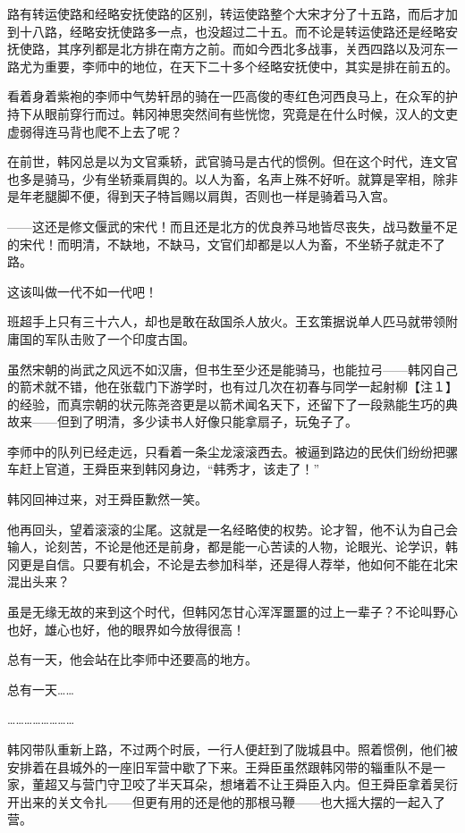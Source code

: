 路有转运使路和经略安抚使路的区别，转运使路整个大宋才分了十五路，而后才加到十八路，经略安抚使路多一点，也没超过二十五。而不论是转运使路还是经略安抚使路，其序列都是北方排在南方之前。而如今西北多战事，关西四路以及河东一路尤为重要，李师中的地位，在天下二十多个经略安抚使中，其实是排在前五的。

看着身着紫袍的李师中气势轩昂的骑在一匹高俊的枣红色河西良马上，在众军的护持下从眼前穿行而过。韩冈神思突然间有些恍惚，究竟是在什么时候，汉人的文吏虚弱得连马背也爬不上去了呢？

在前世，韩冈总是以为文官乘轿，武官骑马是古代的惯例。但在这个时代，连文官也多是骑马，少有坐轿乘肩舆的。以人为畜，名声上殊不好听。就算是宰相，除非是年老腿脚不便，得到天子特旨赐以肩舆，否则也一样是骑着马入宫。

——这还是修文偃武的宋代！而且还是北方的优良养马地皆尽丧失，战马数量不足的宋代！而明清，不缺地，不缺马，文官们却都是以人为畜，不坐轿子就走不了路。

这该叫做一代不如一代吧！

班超手上只有三十六人，却也是敢在敌国杀人放火。王玄策据说单人匹马就带领附庸国的军队击败了一个印度古国。

虽然宋朝的尚武之风远不如汉唐，但书生至少还是能骑马，也能拉弓——韩冈自己的箭术就不错，他在张载门下游学时，也有过几次在初春与同学一起射柳【注１】的经验，而真宗朝的状元陈尧咨更是以箭术闻名天下，还留下了一段熟能生巧的典故来——但到了明清，多少读书人好像只能拿扇子，玩兔子了。

李师中的队列已经走远，只看着一条尘龙滚滚西去。被逼到路边的民伕们纷纷把骡车赶上官道，王舜臣来到韩冈身边，“韩秀才，该走了！”

韩冈回神过来，对王舜臣歉然一笑。

他再回头，望着滚滚的尘尾。这就是一名经略使的权势。论才智，他不认为自己会输人，论刻苦，不论是他还是前身，都是能一心苦读的人物，论眼光、论学识，韩冈更是自信。只要有机会，不论是去参加科举，还是得人荐举，他如何不能在北宋混出头来？

虽是无缘无故的来到这个时代，但韩冈怎甘心浑浑噩噩的过上一辈子？不论叫野心也好，雄心也好，他的眼界如今放得很高！

总有一天，他会站在比李师中还要高的地方。

总有一天……

……………………

韩冈带队重新上路，不过两个时辰，一行人便赶到了陇城县中。照着惯例，他们被安排着在县城外的一座旧军营中歇了下来。王舜臣虽然跟韩冈带的辎重队不是一家，董超又与营门守卫咬了半天耳朵，想堵着不让王舜臣入内。但王舜臣拿着吴衍开出来的关文令扎——但更有用的还是他的那根马鞭——也大摇大摆的一起入了营。

